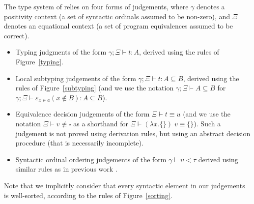 \begin{definition}[judgements]
  The type system of \pml relies on four forms of judgements, where $\gamma$
  denotes a positivity context (a set of syntactic ordinals assumed to be
  non-zero), and $\Xi$ denotes an equational context (a set of program
  equivalences assumed to be correct).
  \begin{itemize}
    \item Typing judgments of the form $\gamma; \Xi \vdash t : A$, derived
          using the rules of Figure~\ref{typing}.
    \item Local subtyping judgements of the form $\gamma; \Xi \vdash t : A
          \subseteq B$, derived using the rules of Figure~\ref{subtyping}
          (and we use the notation $\gamma; \Xi \vdash A \subseteq B$ for
          $\gamma;\Xi\vdash\varepsilon_{x \in a}(x \notin B):A \subseteq B$).
    \item Equivalence decision judgements of the form $\Xi \vdash t \equiv u$
          (and we use the notation $\Xi \vdash v \not\equiv \square$ as a
          shorthand for $\Xi \vdash (\lambda x.\{\})\;v \equiv \{\}$). Such
          a judgement is not proved using derivation rules, but using an
          abstract decision procedure (that is necessarily incomplete).
    \item Syntactic ordinal ordering judgements of the form $\gamma \vdash
          \upsilon < \tau$ derived using similar rules as in previous work
          \cite{LepRaf2018a}.
  \end{itemize}
  Note that we implicitly consider that every syntactic element in our
  judgements is well-sorted, according to the rules of Figure~\ref{sorting}.
\end{definition}

